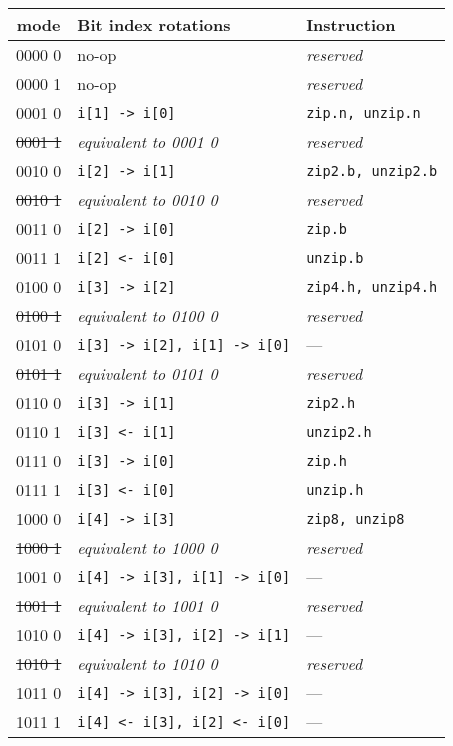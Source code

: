 \begin{table}[h]
\begin{small}
\begin{center}
\begin{tabular}{c l l}
      mode   & Bit index rotations               & Instruction \\ \hline

      0000 0  & no-op                            & {\it reserved} \\
      0000 1  & no-op                            & {\it reserved} \\
      0001 0  & {\tt i[1] -> i[0]}               & {\tt zip.n, unzip.n} \\
\sout{0001 1} & {\it equivalent to 0001 0}       & {\it reserved} \\
      0010 0  & {\tt i[2] -> i[1]}               & {\tt zip2.b, unzip2.b} \\
\sout{0010 1} & {\it equivalent to 0010 0}       & {\it reserved} \\
      0011 0  & {\tt i[2] -> i[0]}               & {\tt zip.b} \\
      0011 1  & {\tt i[2] <- i[0]}               & {\tt unzip.b} \\

\hline

      0100 0  & {\tt i[3] -> i[2]}               & {\tt zip4.h, unzip4.h} \\
\sout{0100 1} & {\it equivalent to 0100 0}       & {\it reserved} \\
      0101 0  & {\tt i[3] -> i[2], i[1] -> i[0]} & --- \\
\sout{0101 1} & {\it equivalent to 0101 0}       & {\it reserved} \\
      0110 0  & {\tt i[3] -> i[1]}               & {\tt zip2.h} \\
      0110 1  & {\tt i[3] <- i[1]}               & {\tt unzip2.h} \\
      0111 0  & {\tt i[3] -> i[0]}               & {\tt zip.h} \\
      0111 1  & {\tt i[3] <- i[0]}               & {\tt unzip.h} \\

\hline

      1000 0  & {\tt i[4] -> i[3]}               & {\tt zip8, unzip8} \\
\sout{1000 1} & {\it equivalent to 1000 0}       & {\it reserved} \\
      1001 0  & {\tt i[4] -> i[3], i[1] -> i[0]} & --- \\
\sout{1001 1} & {\it equivalent to 1001 0}       & {\it reserved} \\
      1010 0  & {\tt i[4] -> i[3], i[2] -> i[1]} & --- \\
\sout{1010 1} & {\it equivalent to 1010 0}       & {\it reserved} \\
      1011 0  & {\tt i[4] -> i[3], i[2] -> i[0]} & --- \\
      1011 1  & {\tt i[4] <- i[3], i[2] <- i[0]} & --- \\


\end{tabular}
\end{center}
\end{small}
\end{table}

